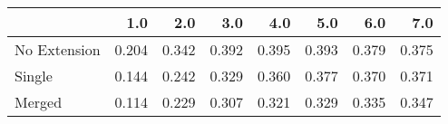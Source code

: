 \begin{tabular}{lrrrrrrr}
\toprule
{} &   1.0 &   2.0 &   3.0 &   4.0 &   5.0 &   6.0 &   7.0 \\
\midrule
No Extension & 0.204 & 0.342 & 0.392 & 0.395 & 0.393 & 0.379 & 0.375 \\
Single       & 0.144 & 0.242 & 0.329 & 0.360 & 0.377 & 0.370 & 0.371 \\
Merged       & 0.114 & 0.229 & 0.307 & 0.321 & 0.329 & 0.335 & 0.347 \\
\bottomrule
\end{tabular}
